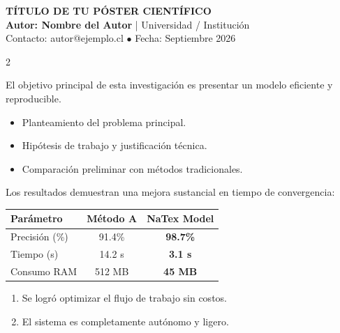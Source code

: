 \documentclass[a4paper,12pt]{article}
\begin{document}
\begin{tcolorbox}[colback=darkslate,colframe=natexorange,boxrule=2pt,arc=4mm,center]
  \centering
  {\Huge \bfseries \color{white} TÍTULO DE TU PÓSTER CIENTÍFICO}\\[0.3cm]
  {\Large \color{natexorange} \textbf{Autor: Nombre del Autor}} \quad 
  {\large \color{gray!30} | \quad Universidad / Institución}\\[0.2cm]
  {\small \color{gray!40} Contacto: autor@ejemplo.cl \quad $\bullet$ \quad Fecha: Septiembre 2026}
\end{tcolorbox}

\vspace{0.3cm}

\begin{multicols}{2}

\begin{tcolorbox}[title=1. Introducción y Objetivos]
El objetivo principal de esta investigación es presentar un modelo eficiente y reproducible.
\begin{itemize}
  \item Planteamiento del problema principal.
  \item Hipótesis de trabajo y justificación técnica.
  \item Comparación preliminar con métodos tradicionales.
\end{itemize}
\end{tcolorbox}


\begin{tcolorbox}[title=3. Resultados Experimentales]
Los resultados demuestran una mejora sustancial en tiempo de convergencia:
\begin{center}
\begin{tabular}{|l|c|c|}
\hline
\textbf{Parámetro} & \textbf{Método A} & \textbf{NaTex Model} \\
\hline
Precisión (\%) & 91.4\% & \textbf{98.7\%} \\
Tiempo (s) & 14.2 s & \textbf{3.1 s} \\
Consumo RAM & 512 MB & \textbf{45 MB} \\
\hline
\end{tabular}
\end{center}
\end{tcolorbox}

\begin{tcolorbox}[title=4. Conclusiones]
\begin{enumerate}
  \item Se logró optimizar el flujo de trabajo sin costos.
  \item El sistema es completamente autónomo y ligero.
\end{enumerate}
\end{tcolorbox}

\end{multicols}
\end{document}

